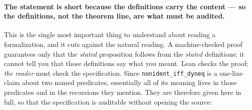 \documentclass[11pt]{article}
\begin{document}
\paragraph{The statement is short because the definitions carry the content
--- so the definitions, not the theorem line, are what must be audited.}
This is the single most important thing to understand about reading a
formalization, and it cuts against the natural reading. A machine-checked
proof guarantees only that the \emph{stated} proposition follows from the
\emph{stated} definitions; it cannot tell you that those definitions say
what you meant. Lean checks the proof; \emph{the reader} must check the
specification. Since \texttt{nonident\_iff\_dyneq} is a one-line claim about
two named predicates, essentially all of its meaning lives in those
predicates and in the recursions they mention. They are therefore given
here in full, so that the specification is auditable without opening the
source:
\end{document}
